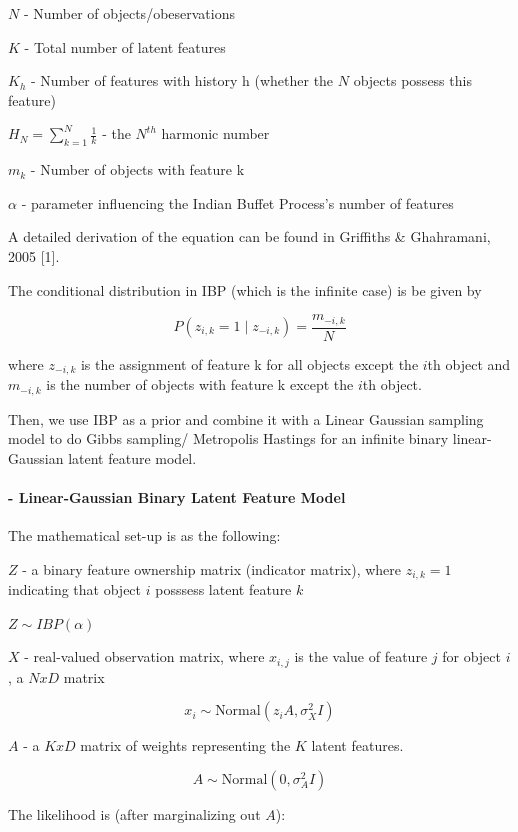\documentclass[11pt]{article}
\begin{document}
\(N\) - Number of objects/obeservations

\(K\) - Total number of latent features

\(K_h\) - Number of features with history h (whether the \(N\) objects
possess this feature)

\(H_N = \sum_{k=1}^{N} \frac{1}{k}\) - the \(N^{th}\) harmonic number

\(m_k\) - Number of objects with feature k

\(\alpha\) - parameter influencing the Indian Buffet Process's number of
features

A detailed derivation of the equation can be found in Griffiths \&
Ghahramani, 2005 {[}1{]}.

The conditional distribution in IBP (which is the infinite case) is be
given by

\[ P( z_{i,k} = 1 \mid z_{-i,k}) = \frac{m_{-i, k}}{N}\]

where \(z_{−i,k}\) is the assignment of feature k for all objects except
the \(i\)th object and \(m_{−i,k}\) is the number of objects with
feature k except the \(i\)th object.

    Then, we use IBP as a prior and combine it with a Linear Gaussian
sampling model to do Gibbs sampling/ Metropolis Hastings for an infinite
binary linear-Gaussian latent feature model.

    \hypertarget{linear-gaussian-binary-latent-feature-model}{%
\paragraph{- Linear-Gaussian Binary Latent Feature
Model}\label{linear-gaussian-binary-latent-feature-model}}

The mathematical set-up is as the following:

\(Z\) - a binary feature ownership matrix (indicator matrix), where
\(z_{i,k}=1\) indicating that object \(i\) posssess latent feature \(k\)

\(Z \sim IBP(\alpha)\)

\(X\) - real-valued observation matrix, where \(x_{i,j}\) is the value
of feature \(j\) for object \(i\), a \({N x D}\) matrix

\[x_i \sim \text{Normal}(z_i A, \sigma_X^2 I) \]

\(A\) - a \({K x D}\) matrix of weights representing the \(\textit{K}\)
latent features.

\[A \sim \text{Normal}(0, \sigma_A^2 I)\]

The likelihood is (after marginalizing out \(A\)):
\end{document}
